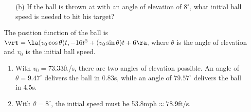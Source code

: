 {{\begin{enumerate}
	\item [(b)] If the ball is thrown at with an angle of elevation of $8^\circ$, what initial ball speed is needed to hit his target?
\end{enumerate}
}{The position function of the ball is $\vrt = \la (v_0\cos\theta)t,-16t^2+(v_0\sin\theta)t+6\ra$, where $\theta$ is the angle of elevation and $v_0$ is the initial ball speed.
\begin{enumerate}
	\item With $v_0 = 73.33$ft/s, there are two angles of elevation possible. An angle of $\theta = 9.47^\circ$ delivers the ball in 0.83s, while an angle of $79.57^\circ$ delivers the ball in $4.5$s.
	\item	With $\theta=8^\circ$, the initial speed must be 53.8mph$\approx 78.9$ft/s.
	
\end{enumerate}
}
}